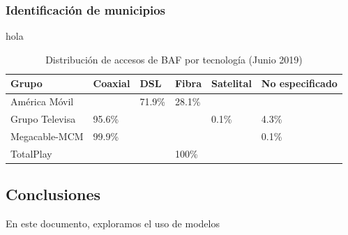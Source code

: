 \documentclass[9pt,twocolumn,twoside]{ilcss}
\begin{document}
\subsubsection{Identificación de municipios}

hola

\begin{table}[tbhp]
 \centering
	\caption{Distribución de accesos de BAF por tecnología (Junio 2019)\label{table:distribaccesosgrupos}}
	\begin{tabular}{@{}llllll@{}}
		\toprule
		Grupo & Coaxial & DSL & Fibra & Satelital & No especificado \\ \midrule
		América Móvil &  & 71.9\% & 28.1\% &  &  \\ 
		Grupo Televisa & 95.6\% &  &  & 0.1\% & 4.3\% \\ 
		Megacable-MCM & 99.9\% &  &  &  & 0.1\% \\ 
		TotalPlay &  &  & 100\% &  &  \\ \bottomrule
	\end{tabular}
\end{table}


\subsection{Conclusiones}

En este documento, exploramos el uso de modelos 

\end{document}
